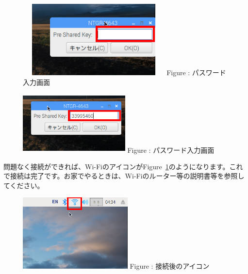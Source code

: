 \documentclass[a4paper,12pt]{jarticle}
\begin{document}
\begin{figure}
  \centering
  \begin{minipage}{7.712cm}
    {\upshape
      \includegraphics[width=7.712cm,height=3.888cm]{textbook-img026.png}
      \newline
      Figure : パスワード入力画面}
  \end{minipage}
  \begin{minipage}{7.241cm}
    {\upshape
      \includegraphics[width=5.577cm,height=3.228cm]{textbook-img025.png}
      \newline
      Figure : パスワード入力画面}
  \end{minipage}
\end{figure}
問題なく接続ができれば、Wi-FiのアイコンがFigure~\ref{seq:refFigure13}のようになります。これで接続は完了です。お家でやるときは、Wi-Fiのルーター等の説明書等を参照してください。

\begin{figure}
  \centering
  \begin{minipage}{7.334cm}
    {\upshape
      \includegraphics[width=5.708cm,height=3.895cm]{textbook-img027.png}
      \newline
      Figure {\theFigure\label{seq:refFigure13}}:
      接続後のアイコン}
  \end{minipage}
\end{figure}
\clearpage
\end{document}
